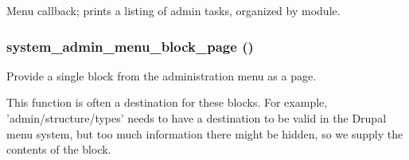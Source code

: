 \label{system_8admin_8inc_a89bec592ed801dd4eb6f50c450e4d54e}
Menu callback; prints a listing of admin tasks, organized by module. \hypertarget{system_8admin_8inc_ade03d94c63a6cce2148fc06982f510cb}{
\subsubsection[{system\_\-admin\_\-menu\_\-block\_\-page}]{\setlength{\rightskip}{0pt plus 5cm}system\_\-admin\_\-menu\_\-block\_\-page ()}}
\label{system_8admin_8inc_ade03d94c63a6cce2148fc06982f510cb}
Provide a single block from the administration menu as a page.

This function is often a destination for these blocks. For example, 'admin/structure/types' needs to have a destination to be valid in the Drupal menu system, but too much information there might be hidden, so we supply the contents of the block.

